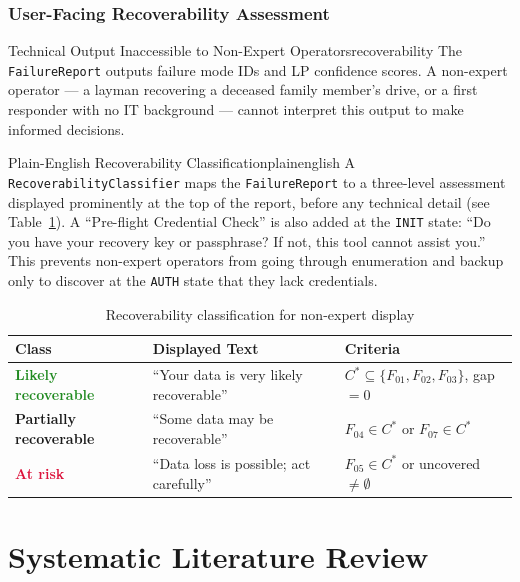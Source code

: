 \documentclass[11pt,a4paper]{report}
\begin{document}
\section{User-Facing Recoverability Assessment}

\begin{edgecase}{Technical Output Inaccessible to Non-Expert Operators}{recoverability}
The \texttt{FailureReport} outputs failure mode IDs and LP confidence scores. A non-expert operator --- a layman recovering a deceased family member's drive, or a first responder with no IT background --- cannot interpret this output to make informed decisions.
\end{edgecase}

\begin{solution}{Plain-English Recoverability Classification}{plainenglish}
A \texttt{RecoverabilityClassifier} maps the \texttt{FailureReport} to a three-level assessment displayed prominently at the top of the report, before any technical detail (see Table~\ref{tab:recoverability}). A ``Pre-flight Credential Check'' is also added at the \texttt{INIT} state: ``Do you have your recovery key or passphrase? If not, this tool cannot assist you.'' This prevents non-expert operators from going through enumeration and backup only to discover at the \texttt{AUTH} state that they lack credentials.
\end{solution}

\begin{table}[htbp]
\centering
\caption{Recoverability classification for non-expert display}
\label{tab:recoverability}
\begin{tabular}{@{}lll@{}}
\toprule
\textbf{Class} & \textbf{Displayed Text} & \textbf{Criteria} \\
\midrule
\textcolor{forestgreen}{\textbf{Likely recoverable}} & ``Your data is very likely recoverable'' & $C^* \subseteq \{F_{01}, F_{02}, F_{03}\}$, gap $= 0$ \\
\textcolor{amber}{\textbf{Partially recoverable}} & ``Some data may be recoverable'' & $F_{04} \in C^*$ or $F_{07} \in C^*$ \\
\textcolor{crimson}{\textbf{At risk}} & ``Data loss is possible; act carefully'' & $F_{05} \in C^*$ or uncovered $\neq \emptyset$ \\
\bottomrule
\end{tabular}
\end{table}

\part{Systematic Literature Review}
\end{document}
